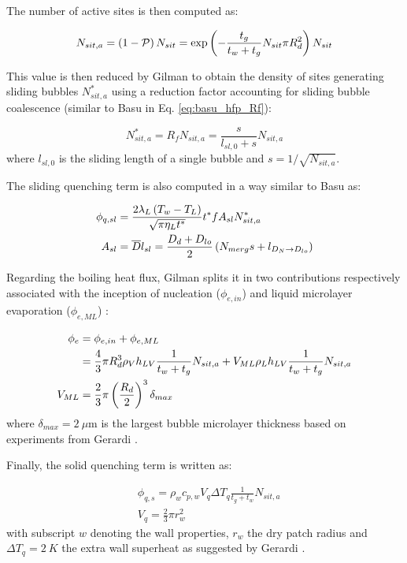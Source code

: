 The number of active sites is then computed as:

\begin{equation}
N_{sit,a} = \left( 1-\mathcal{P} \right)N_{sit} = \mathrm{exp}\left( -\dfrac{t_{g}}{t_{w}+t_{g}}N_{sit}\pi R_{d}^{2} \right) N_{sit}
\label{eq:gilman_hfp_nsita}
\end{equation}

This value is then reduced by Gilman to obtain the density of sites generating sliding bubbles $N_{sit,a}^{*}$ using a reduction factor accounting for sliding bubble coalescence (similar to Basu \etal in Eq. \ref{eq:basu_hfp_Rf}):

\begin{equation}
N_{sit,a}^{*}=R_{f}N_{sit,a} = \frac{s}{l_{sl,0}+s} N_{sit,a}
\end{equation}
where $l_{sl,0}$ is the sliding length of a single bubble and $s=1/\sqrt{N_{sit,a}}$.


The sliding quenching term is also computed in a way similar to Basu \etal as:

\begin{align}
\phi_{q,sl}&=\frac{2\lambda_{L}\parth{T_{w}-T_{L}}}{\sqrt{\pi \eta_{L}t^{*}}} t^{*}fA_{sl}N_{sit,a}^{*}
\label{eq:gilman_hfp_phiq} \\
%
A_{sl} &= \overline{D}l_{sl} = \frac{D_{d}+D_{lo}}{2}\parth{N_{merg}s+l_{D_{N}\rightarrow D_{lo}}}
\end{align}

Regarding the boiling heat flux, Gilman splits it in two contributions respectively associated with the inception of nucleation ($\phi_{e,in}$) and liquid microlayer evaporation ($\phi_{e,ML}$) :

\begin{align}
\phi_{e} &= \phi_{e,in} + \phi_{e,ML} \\
%
&= \frac{4}{3}\pi R_{d}^{3}\rho_{V} h_{LV} \frac{1}{t_{w}+t_{g}}N_{sit,a} + V_{ML} \rho_{L}h_{LV} \frac{1}{t_{w}+t_{g}}N_{sit,a}\\
%
V_{ML} &= \frac{2}{3}\pi \parth{\frac{R_{d}}{2}}^{3}\delta_{max}
\end{align}
where $\delta_{max}=2\ \mu\text{m}$ is the largest bubble microlayer thickness based on experiments from Gerardi \cite{gerardi_investigation_2009}.

\npar

Finally, the solid quenching term is written as:

\begin{align}
& \phi_{q,s} = \rho_{w} c_{p,w} V_{q} \Delta T_{q} \frac{1}{t_{g}+t_{w}} N_{sit,a}\\
%
& V_{q} = \frac{2}{3} \pi r_{w}^{2}
\end{align}
with subscript $w$ denoting the wall properties, $r_{w}$ the dry patch radius and $\Delta T_{q}=2\ K$ the extra wall superheat as suggested by Gerardi \etal \cite{gerardi_study_2010}.

